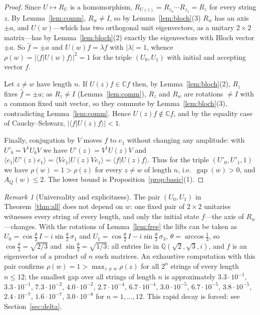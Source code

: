 \documentclass[11pt]{amsart}
\theoremstyle{definition}
\theoremstyle{remark}
\newtheorem{remark}[theorem]{Remark}
\newcommand{\C}{\mathbb{C}}
\newcommand{\Q}{\mathbb{Q}}
\newcommand{\AQ}{A_Q}
\newcommand{\gapp}{\operatorname{gap}}
\begin{document}
\begin{proof}
Since $U\mapsto R_U$ is a homomorphism, $R_{U(z)}=R_{z_n}\cdots
R_{z_1}=R_z$ for every string $z$. By Lemma~\ref{lem:comm}, $R_w\ne
I$, so by Lemma~\ref{lem:bloch}(3) $R_w$ has an axis $\pm a$, and
$U(w)$---which has two orthogonal unit eigenvectors, as a unitary
$2\times2$ matrix---has by Lemma~\ref{lem:bloch}(2) exactly the
eigenvectors with Bloch vector $\pm a$. So $\hat f=\pm a$ and
$U(w)f=\lambda f$ with $|\lambda|=1$, whence
$\rho(w)=|\langle f|U(w)f\rangle|^2=1$ for the triple
$(U_0,U_1)$ with initial and accepting vector $f$.

Let $z\ne w$ have length $n$. If $U(z)f\in\C f$ then, by
Lemma~\ref{lem:bloch}(2), $R_z$ fixes $\hat f=\pm a$; as $R_z\ne I$
(Lemma~\ref{lem:comm}), $R_z$ and $R_w$ are rotations $\ne I$ with a
common fixed unit vector, so they commute by
Lemma~\ref{lem:bloch}(3), contradicting Lemma~\ref{lem:comm}. Hence
$U(z)f\notin\C f$, and by the equality case of Cauchy--Schwarz,
$|\langle f|U(z)f\rangle|<1$.

Finally, conjugation by $V$ moves $f$ to $e_1$ without changing any
amplitude: with $U'_b=V^\dagger U_bV$ we have $U'(z)=V^\dagger U(z)V$
and $\langle e_1|U'(z)e_1\rangle=\langle Ve_1|U(z)Ve_1\rangle=\langle
f|U(z)f\rangle$. Thus for the triple $(U'_0,U'_1,1)$ we have
$\rho(w)=1>\rho(z)$ for every $z\ne w$ of length $n$, i.e.\
$\gapp(w)>0$, and $\AQ(w)\le2$. The lower bound is
Proposition~\ref{prop:basic}(1).
\end{proof}

\begin{remark}[Universality and explicitness]\label{rem:universal}
The pair $(U_0,U_1)$ in Theorem~\ref{thm:all} does not depend on $w$:
one fixed pair of $2\times2$ unitaries witnesses every string of every
length, and only the initial state $f$---the axis of $R_w$---changes.
With the rotations of Lemma~\ref{lem:free} the lifts can be taken as
$U_0=\cos\frac\theta2\,I-i\sin\frac\theta2\,\sigma_1$ and
$U_1=\cos\frac\theta2\,I-i\sin\frac\theta2\,\sigma_3$,
$\theta=\arccos\frac13$, so $\cos\frac\theta2=\sqrt{2/3}$ and
$\sin\frac\theta2=\sqrt{1/3}$: all entries lie in $\Q(\sqrt2,\sqrt3,i)$,
and $f$ is an eigenvector of a product of $n$ such matrices. An
exhaustive computation with this pair confirms $\rho(w)=1>\max_{z\ne
w}\rho(z)$ for all $2^n$ strings of every length $n\le12$; the
smallest gap over all strings of length $n$ is approximately
$3.3\cdot10^{-1}$, $3.3\cdot10^{-1}$, $7.3\cdot10^{-2}$,
$4.0\cdot10^{-2}$, $2.7\cdot10^{-4}$, $6.7\cdot10^{-4}$,
$3.0\cdot10^{-5}$, $6.7\cdot10^{-5}$, $3.8\cdot10^{-5}$,
$2.4\cdot10^{-7}$, $1.6\cdot10^{-7}$, $3.0\cdot10^{-8}$ for
$n=1,\dots,12$. This rapid decay is forced: see
Section~\ref{sec:delta}.
\end{remark}
\end{document}
